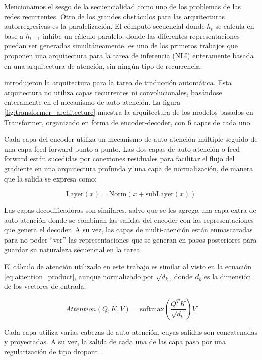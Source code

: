 Mencionamos el sesgo de la secuencialidad como uno de los problemas de las redes recurrentes. Otro de los grandes obstáculos para las arquitecturas autorregresivas es la paralelización. El cómputo secuencial donde $h_t$ se calcula en base a $h_{t-1}$ inhibe un cálculo paralelo, donde las diferentes representaciones puedan ser generadas simultáneamente. \citet{parikh-etal-2016-decomposable} es uno de los primeros trabajos que proponen una arquitectura para la tarea de inferencia (NLI) enteramente basada en una arquitectura de atención, sin ningún tipo de recurrencia.

\citet{vaswani2017attention} introdujeron la arquitectura  para la tarea de traducción automática. Esta arquitectura no utiliza capas recurrentes ni convolucionales, basándose enteramente en el mecanismo de auto-atención. La figura \ref{fig:transformer_architecture} muestra la arquitectura de los modelos basados en Transformer, organizado en forma de encoder-decoder, con 6 capas de cada uno.

Cada capa del encoder utiliza un mecanismo de auto-atención múltiple seguido de una capa feed-forward punto a punto. Las dos capas de auto-atención o feed-forward están sucedidas por conexiones residuales \cite{he2016deep} para facilitar el flujo del gradiente en una arquitectura profunda y una capa de normalización, de manera que la salida se expresa como:

\begin{equation*}
    \text{Layer}(x) = \text{Norm}(x + \text{subLayer}(x))
\end{equation*}

Las capas decodificadoras son similares, salvo que se les agrega una capa extra de auto-atención donde se combinan las salidas del encoder con las representaciones que genera el decoder. A su vez, las capas de multi-atención están enmascaradas para no poder ``ver'' las representaciones que se generan en pasos posteriores para guardar su naturaleza secuencial en la tarea.

El cálculo de atención utilizado en este trabajo es similar al visto en la ecuación \ref{eq:attention_product}, aunque normalizado por $\sqrt{d_k}$, donde $d_k$ es la dimensión de los vectores de entrada:

\begin{equation*}
    Attention(Q, K, V) = \text{softmax}(\frac{Q^T K}{\sqrt{d_k}}) V
\end{equation*}

Cada capa utiliza varias cabezas de auto-atención, cuyas salidas son concatenadas y proyectadas. A su vez, la salida de cada una de las capa pasa por una regularización de tipo dropout \cite{srivastava2014dropout}.

